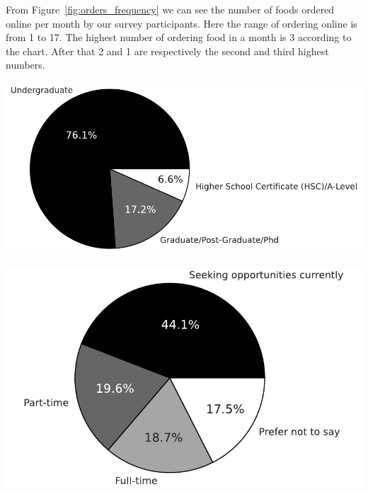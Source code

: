 \documentclass[a4paper,fleqn]{cas-sc}
\begin{document}
From Figure~\ref{fig:orders_frequency} we can see the number of foods ordered online per month by our survey participants. Here the range of ordering online is from 1 to 17. The highest number of ordering food in a month is 3 according to the chart. After that 2 and 1 are respectively the second and third highest numbers. 


\begin{minipage}{.5\textwidth}
\centering
  \includegraphics[width=.9\linewidth]{figs/educational_qualification.pdf}
  \label{fig:education}
\end{minipage}%
\begin{minipage}{.5\textwidth}
\centering
  \includegraphics[width=.7\linewidth]{figs/employment_status.pdf}
  \label{fig:employment}
\end{minipage}
\end{document}
